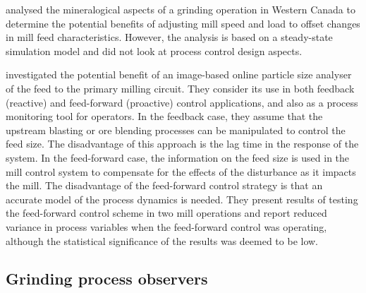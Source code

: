 \cite{liu_development_2018} analysed the mineralogical aspects of a grinding operation in Western Canada to determine the potential benefits of adjusting mill speed and load to offset changes in mill feed characteristics. However, the analysis is based on a steady-state simulation model and did not look at process control design aspects.


%

\cite{steyn_investigating_2018} investigated the potential benefit of an image-based online particle size analyser of the feed to the primary milling circuit. They consider its use in both feedback (reactive) and feed-forward (proactive) control applications, and also as a process monitoring tool for operators. In the feedback case, they assume that the upstream blasting or ore blending processes can be manipulated to control the feed size. The disadvantage of this approach is the lag time in the response of the system. In the feed-forward case, the information on the feed size is used in the mill control system to compensate for the effects of the disturbance as it impacts the mill. The disadvantage of the feed-forward control strategy is that an accurate model of the process dynamics is needed. They present results of testing the feed-forward control scheme in two mill operations and report reduced variance in process variables when the feed-forward control was operating, although the statistical significance of the results was deemed to be low.

\subsection{Grinding process observers}

